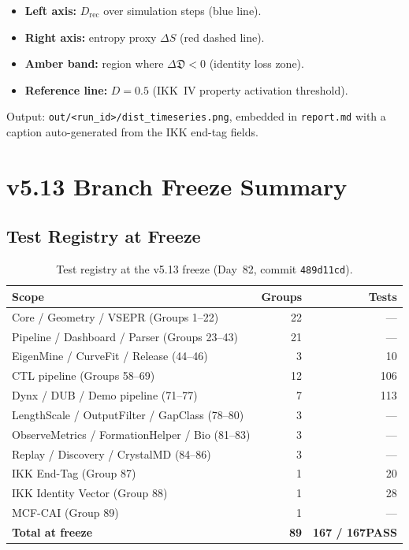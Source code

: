 \documentclass[11pt,a4paper]{article}
\theoremstyle{definition}
\newcommand{\Dfrak}{\mathfrak{D}}
\newcommand{\Drec}{D_{\mathrm{rec}}}
\newcommand{\DeltaD}{\Delta\Dfrak}
\newcommand{\DeltaS}{\Delta S}
\begin{document}
\begin{itemize}
  \item \textbf{Left axis:} $\Drec$ over simulation steps (blue line).
  \item \textbf{Right axis:} entropy proxy $\DeltaS$ (red dashed line).
  \item \textbf{Amber band:} region where $\DeltaD < 0$ (identity loss zone).
  \item \textbf{Reference line:} $D = 0.5$ (IKK~IV property activation threshold).
\end{itemize}

Output: \texttt{out/<run\_id>/dist\_timeseries.png}, embedded in
\texttt{report.md} with a caption auto-generated from the IKK end-tag fields.

\section{v5.13 Branch Freeze Summary}

\subsection{Test Registry at Freeze}

\begin{table}[H]
\centering\small
\begin{tabular}{@{}lrr@{}}
\toprule
Scope & Groups & Tests \\
\midrule
Core / Geometry / VSEPR (Groups 1--22)        & 22 & --- \\
Pipeline / Dashboard / Parser (Groups 23--43) & 21 & --- \\
EigenMine / CurveFit / Release (44--46)       &  3 &  10 \\
CTL pipeline (Groups 58--69)                  & 12 & 106 \\
Dynx / DUB / Demo pipeline (71--77)           &  7 & 113 \\
LengthScale / OutputFilter / GapClass (78--80)&  3 & --- \\
ObserveMetrics / FormationHelper / Bio (81--83)&  3 & --- \\
Replay / Discovery / CrystalMD (84--86)       &  3 & --- \\
IKK End-Tag (Group 87)                        &  1 &  20 \\
IKK Identity Vector (Group 88)                &  1 &  28 \\
MCF-CAI (Group 89)                            &  1 & --- \\
\midrule
\textbf{Total at freeze}
  & \textbf{89}
  & \textbf{167 / 167\quad PASS} \\
\bottomrule
\end{tabular}
\caption{Test registry at the v5.13 freeze (Day~82, commit \texttt{489d11cd}).}
\end{table}
\end{document}
